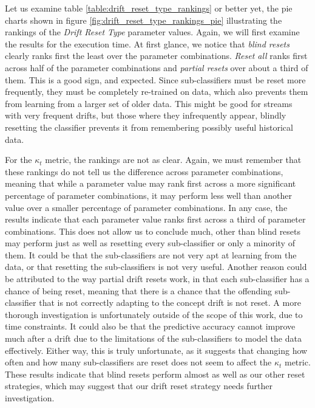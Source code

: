 Let us examine table \ref{table:drift_reset_type_rankings} or better yet, the pie charts shown in figure \ref{fig:drift_reset_type_rankings_pie} illustrating the rankings of the \textit{Drift Reset Type} parameter values.
Again, we will first examine the results for the execution time. At first glance, we notice that \textit{blind resets} clearly ranks first the least over the parameter combinations. \textit{Reset all} ranks first across half of the parameter combinations and \textit{partial resets} over about a third of them. This is a good sign, and expected. Since sub-classifiers must be reset more frequently, they must be completely re-trained on data, which also prevents them from learning from a larger set of older data. This might be good for streams with very frequent drifts, but those where they infrequently appear, blindly resetting the classifier prevents it from remembering possibly useful historical data.

For the $\kappa_t$ metric, the rankings are not as clear. Again, we must remember that these rankings do not tell us the difference across parameter combinations, meaning that while a parameter value may rank first across a more significant percentage of parameter combinations, it may perform less well than another value over a smaller percentage of parameter combinations.
In any case, the results indicate that each parameter value ranks first across a third of parameter combinations. This does not allow us to conclude much, other than blind resets may perform just as well as resetting every sub-classifier or only a minority of them. It could be that the sub-classifiers are not very apt at learning from the data, or that resetting the sub-classifiers is not very useful. Another reason could be attributed to the way partial drift resets work, in that each sub-classifier has a chance of being reset, meaning that there is a chance that the offending sub-classifier that is not correctly adapting to the concept drift is not reset. A more thorough investigation is unfortunately outside of the scope of this work, due to time constraints. It could also be that the predictive accuracy cannot improve much after a drift due to the limitations of the sub-classifiers to model the data effectively. Either way, this is truly unfortunate, as it suggests that changing how often and how many sub-classifiers are reset does not seem to affect the $\kappa_t$ metric.
These results indicate that blind resets perform almost as well as our other reset strategies, which may suggest that our drift reset strategy needs further investigation.

